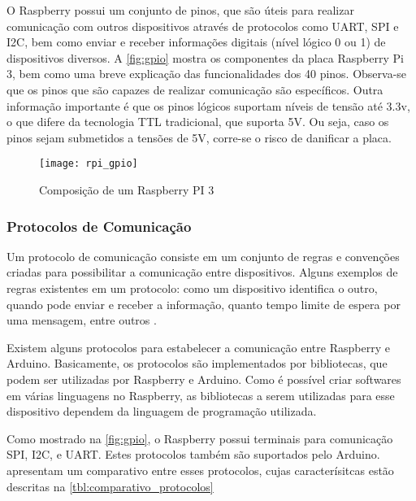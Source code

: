 		O Raspberry possui um conjunto de pinos, que são úteis para realizar comunicação com outros dispositivos através de protocolos como UART, SPI e I2C, bem como enviar e receber informações digitais (nível lógico 0 ou 1) de dispositivos diversos. A \autoref{fig:gpio} mostra os componentes da placa Raspberry Pi 3, bem como uma breve explicação das funcionalidades dos 40 pinos. Observa-se que os pinos que são capazes de realizar comunicação são específicos. Outra informação importante é que os pinos lógicos suportam níveis de tensão até 3.3v, o que difere da tecnologia TTL tradicional, que suporta 5V. Ou seja, caso os pinos sejam submetidos a tensões de 5V, corre-se o risco de danificar a placa.
		
		\begin{figure}[!htb]	
			\captionsetup{justification=centering}
			\setlength{\belowcaptionskip}{-5pt}
			\begin{center}
				\texttt{[image: rpi\_gpio]}  %
				\caption[Composição de um Raspberry PI 3]{\label{fig:gpio}Composição de um Raspberry PI 3}
			\end{center}		
		\end{figure}
	
		\subsubsection{Protocolos de Comunicação}
			Um protocolo de comunicação consiste em um conjunto de regras e convenções criadas para possibilitar a comunicação entre dispositivos. Alguns exemplos de regras existentes em um protocolo: como um dispositivo identifica o outro, quando pode enviar e receber a informação, quanto tempo limite de espera por uma mensagem, entre outros \cite{lucas2016}.
			
			Existem alguns protocolos para estabelecer a comunicação entre Raspberry e Arduino. Basicamente, os protocolos são implementados por bibliotecas, que podem ser utilizadas por Raspberry e Arduino. Como é possível criar softwares em várias linguagens no Raspberry, as bibliotecas a serem utilizadas para esse dispositivo dependem da linguagem de programação utilizada.
			
			Como mostrado na \autoref{fig:gpio}, o Raspberry possui terminais para comunicação SPI, I2C, e UART. Estes protocolos também são suportados pelo Arduino. \textcite{robocore,kevin2015} apresentam um comparativo entre esses protocolos, cujas caracterísitcas estão descritas na \autoref{tbl:comparativo_protocolos}
			
